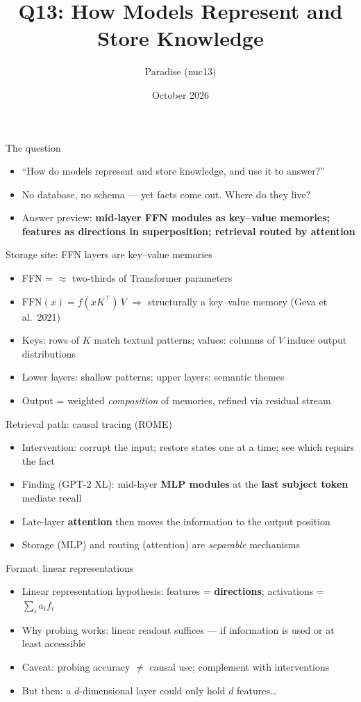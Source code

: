 \documentclass[aspectratio=169,11pt]{beamer}
\title{Q13: How Models Represent and Store Knowledge}
\author{Paradise (nuc13)}
\date{October 2026}
\begin{document}
\frame{\titlepage}

\begin{frame}{The question}
\begin{itemize}
\item ``How do models represent and store knowledge, and use it to answer?''
\item No database, no schema --- yet facts come out. Where do they live?
\item Answer preview: \textbf{mid-layer FFN modules as key--value memories; features as directions in superposition; retrieval routed by attention}
\end{itemize}
\end{frame}

\begin{frame}{Storage site: FFN layers are key--value memories}
\begin{itemize}
\item FFN = $\approx$ two-thirds of Transformer parameters
\item $\mathrm{FFN}(x) = f(xK^\top)\,V$ \quad $\Rightarrow$ structurally a key--value memory (Geva et al.\ 2021)
\item Keys: rows of $K$ match textual patterns; values: columns of $V$ induce output distributions
\item Lower layers: shallow patterns; upper layers: semantic themes
\item Output = weighted \emph{composition} of memories, refined via residual stream
\end{itemize}
\end{frame}

\begin{frame}{Retrieval path: causal tracing (ROME)}
\begin{itemize}
\item Intervention: corrupt the input; restore states one at a time; see which repairs the fact
\item Finding (GPT-2 XL): mid-layer \textbf{MLP modules} at the \textbf{last subject token} mediate recall
\item Late-layer \textbf{attention} then moves the information to the output position
\item Storage (MLP) and routing (attention) are \emph{separable} mechanisms
\end{itemize}
\end{frame}

\begin{frame}{Format: linear representations}
\begin{itemize}
\item Linear representation hypothesis: features = \textbf{directions}; activations = $\sum_i a_i f_i$
\item Why probing works: linear readout suffices --- if information is used or at least accessible
\item Caveat: probing accuracy $\neq$ causal use; complement with interventions
\item But then: a $d$-dimensional layer could only hold $d$ features\dots
\end{itemize}
\end{frame}
\end{document}

